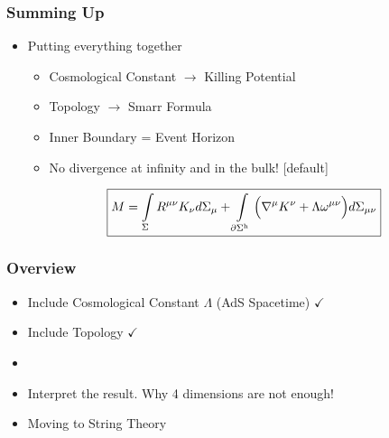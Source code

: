 \documentclass[t]{beamer}
\begin{document}
\begin{frame}
\frametitle{Summing Up}

\begin{itemize}
\setlength{\parskip}{10pt}

\item Putting everything together

\begin{itemize}
[triangle]
\setlength{\parskip}{5pt}
\item Cosmological Constant $\rightarrow$ Killing Potential
\item Topology $\rightarrow$ Smarr Formula
\item Inner Boundary = Event Horizon
\item No divergence at infinity and in the bulk!
[default]
\end{itemize}

\vspace{0.5em}
\begin{align}
\boxed{
M = \int\limits_{\Sigma} R^{\mu\nu} K_\nu d\Sigma_{\mu} + \int\limits_{\partial\Sigma^{\text{h}}} \Big( \nabla^\mu K^{\nu} + \Lambda \omega^{\mu\nu} \Big) d\Sigma_{\mu\nu}} \notag
\end{align}

\end{itemize}
\end{frame}


\begin{frame}
\frametitle{Overview}

\begin{itemize}
\setlength{\parskip}{10pt}
\item Include Cosmological Constant $\Lambda$ (AdS Spacetime) $\checkmark$
\item Include Topology $\checkmark$
\item {}
\item Interpret the result. Why 4 dimensions are not enough!
\item Moving to String Theory
\end{itemize}
\end{frame}

\end{document}
